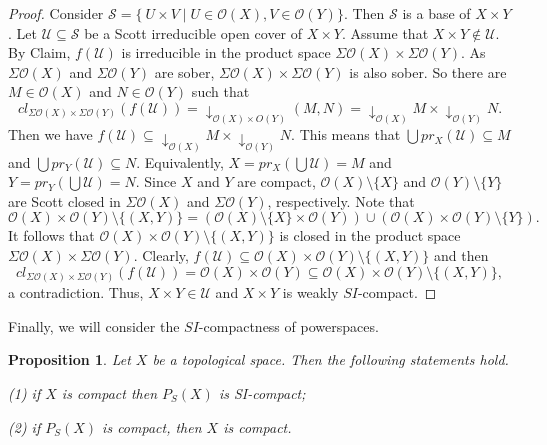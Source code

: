\documentclass[preprint,12pt]{elsarticle}
\numberwithin{equation}{section}
\newtheorem{proposition}[theorem]{Proposition}
\begin{document}
\begin{proof}
Consider $\mathcal{S}=\{\ U\times V\mid U\in \mathcal{O}(X), V\in\mathcal{O}(Y)\}$. Then $\mathcal{S}$ is a base of $X\times Y$. Let $\mathcal{U}\subseteq\mathcal{S}$ be a Scott irreducible open cover of $X\times Y$. Assume that $X\times Y\not \in \mathcal{U}$. By Claim, $f(\mathcal{U})$ is irreducible in the product space $\Sigma \mathcal{O}(X)\times\Sigma \mathcal{O}(Y)$. As $\Sigma \mathcal{O}(X)$ and $\Sigma \mathcal{O}(Y)$ are sober, $\Sigma \mathcal{O}(X)\times\Sigma \mathcal{O}(Y)$ is also sober. So there are $M\in\mathcal{O}(X)$ and $N\in\mathcal{O}(Y)$ such that $$cl_{\Sigma \mathcal{O}(X)\times\Sigma \mathcal{O}(Y)}(f(\mathcal{U}))=\downarrow_{\mathcal{O}(X)\times{O}(Y)}(M,N)=\downarrow_{\mathcal{O}(X)}M\times\downarrow_{\mathcal{O}(Y)}N.$$
Then we have $f(\mathcal{U})\subseteq\downarrow_{\mathcal{O}(X)}M\times\downarrow_{\mathcal{O}(Y)}N$. This means that $\bigcup pr_{X}(\mathcal{U})\subseteq M$ and $\bigcup pr_{Y}(\mathcal{U})\subseteq N$. Equivalently, $X=pr_{X}(\bigcup\mathcal{U})=M$ and $Y=pr_{Y}(\bigcup\mathcal{U})=N$. Since $X$ and $Y$ are compact, $\mathcal{O}(X)\setminus\{X\}$ and $\mathcal{O}(Y)\setminus\{Y\}$ are Scott closed in $\Sigma \mathcal{O}(X)$ and $\Sigma \mathcal{O}(Y)$, respectively. Note that $$\mathcal{O}(X)\times\mathcal{O}(Y)\setminus\{(X,Y)\}=(\mathcal{O}(X)\setminus\{X\}\times\mathcal{O}(Y))\cup(\mathcal{O}(X)\times\mathcal{O}(Y)\setminus\{Y\}).$$ It follows that $\mathcal{O}(X)\times\mathcal{O}(Y)\setminus\{(X,Y)\}$ is closed in the product space $\Sigma \mathcal{O}(X)\times\Sigma \mathcal{O}(Y)$. Clearly, $f(\mathcal{U})\subseteq\mathcal{O}(X)\times\mathcal{O}(Y)\setminus\{(X,Y)\}$ and then $$cl_{\Sigma \mathcal{O}(X)\times\Sigma \mathcal{O}(Y)}(f(\mathcal{U}))=\mathcal{O}(X)\times\mathcal{O}(Y)\subseteq\mathcal{O}(X)\times\mathcal{O}(Y)\setminus\{(X,Y)\},$$ a contradiction. Thus, $X\times Y\in\mathcal{U}$ and $X\times Y$ is weakly $SI$-compact.\end{proof}

\quad Finally, we will consider the $SI$-compactness of powerspaces.

\begin{proposition} Let $X$ be a topological space. Then the following statements hold.

{\rm(1)} if $X$ is compact then $P_{S}(X)$ is SI-compact;

{\rm(2)} if $P_{S}(X)$ is compact, then $X$ is compact.
\end{proposition}
\end{document}
